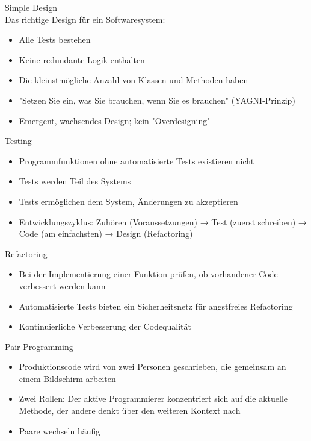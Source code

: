 \begin{concept}{Simple Design}\\
    Das richtige Design für ein Softwaresystem:
    \begin{itemize}
        \item Alle Tests bestehen
        \item Keine redundante Logik enthalten
        \item Die kleinstmögliche Anzahl von Klassen und Methoden haben
        \item "Setzen Sie ein, was Sie brauchen, wenn Sie es brauchen" (YAGNI-Prinzip)
        \item Emergent, wachsendes Design; kein "Overdesigning"
    \end{itemize}
\end{concept}

\begin{concept}{Testing}\\
    \begin{itemize}
        \item Programmfunktionen ohne automatisierte Tests existieren nicht
        \item Tests werden Teil des Systems
        \item Tests ermöglichen dem System, Änderungen zu akzeptieren
        \item Entwicklungszyklus: Zuhören (Voraussetzungen) → Test (zuerst schreiben) → Code (am einfachsten) → Design (Refactoring)
    \end{itemize}
\end{concept}

\begin{concept}{Refactoring}\\
    \begin{itemize}
        \item Bei der Implementierung einer Funktion prüfen, ob vorhandener Code verbessert werden kann
        \item Automatisierte Tests bieten ein Sicherheitsnetz für angstfreies Refactoring
        \item Kontinuierliche Verbesserung der Codequalität
    \end{itemize}
\end{concept}

\begin{concept}{Pair Programming}\\
    \begin{itemize}
        \item Produktionscode wird von zwei Personen geschrieben, die gemeinsam an einem Bildschirm arbeiten
        \item Zwei Rollen: Der aktive Programmierer konzentriert sich auf die aktuelle Methode, der andere denkt über den weiteren Kontext nach
        \item Paare wechseln häufig
    \end{itemize}
\end{concept}

